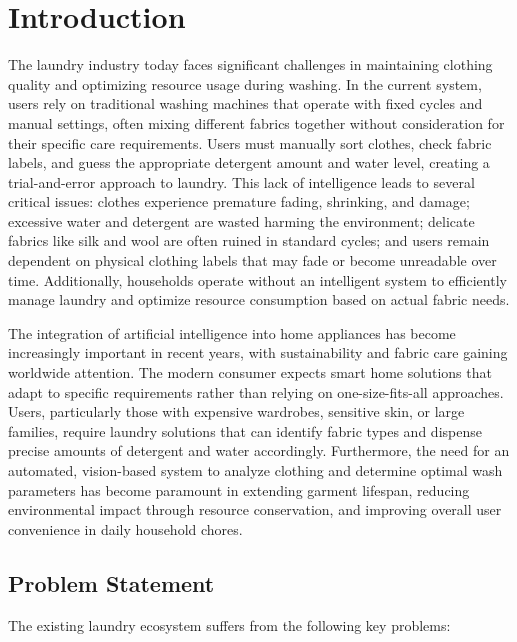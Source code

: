 \chapter{Introduction}
\label{ch:introduction}
\noindent
The laundry industry today faces significant challenges in maintaining clothing quality and optimizing resource usage during washing. In the current system, users rely on traditional washing machines that operate with fixed cycles and manual settings, often mixing different fabrics together without consideration for their specific care requirements. Users must manually sort clothes, check fabric labels, and guess the appropriate detergent amount and water level, creating a trial-and-error approach to laundry. This lack of intelligence leads to several critical issues: clothes experience premature fading, shrinking, and damage; excessive water and detergent are wasted harming the environment; delicate fabrics like silk and wool are often ruined in standard cycles; and users remain dependent on physical clothing labels that may fade or become unreadable over time. Additionally, households operate without an intelligent system to efficiently manage laundry and optimize resource consumption based on actual fabric needs.

\noindent
The integration of artificial intelligence into home appliances has become increasingly important in recent years, with sustainability and fabric care gaining worldwide attention. The modern consumer expects smart home solutions that adapt to specific requirements rather than relying on one-size-fits-all approaches. Users, particularly those with expensive wardrobes, sensitive skin, or large families, require laundry solutions that can identify fabric types and dispense precise amounts of detergent and water accordingly. Furthermore, the need for an automated, vision-based system to analyze clothing and determine optimal wash parameters has become paramount in extending garment lifespan, reducing environmental impact through resource conservation, and improving overall user convenience in daily household chores.

\section{Problem Statement}
The existing laundry ecosystem suffers from the following key problems:

